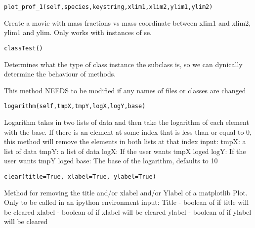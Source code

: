 \begin{verbatim}
plot_prof_1(self,species,keystring,xlim1,xlim2,ylim1,ylim2)
\end{verbatim}
Create a movie with mass fractions vs mass coordinate 
		between xlim1 and xlim2, ylim1 and ylim. Only works with instances of se.\newline\newline
\begin{verbatim}
classTest()
\end{verbatim}
Determines what the type of class instance the subclass is, so
		we can dynically determine the behaviour of methods.
		
		This method NEEDS to be modified if any names of files or classes
		are changed
\newline
\newline
\begin{verbatim}
logarithm(self,tmpX,tmpY,logX,logY,base)
\end{verbatim}
Logarithm takes in two lists of data and then take the 
		logarithm of each element with the base. If there is an
		element at some index that is less than or equal to 0, this 
		method will remove the elements in both lists at that index\newline
		input:\newline
		tmpX: a list of data\newline
		tmpY: a list of data\newline
		logX: If the user wants tmpX loged\newline
		logY: If the user wants tmpY loged\newline
		base: The base of the logarithm, defaults to 10\newline
		
		
\begin{verbatim}
clear(title=True, xlabel=True, ylabel=True)
\end{verbatim}
Method for removing the title and/or xlabel and/or Ylabel
		of a matplotlib Plot.  Only to be called in an ipython 
		environment\newline
		input:\newline
		Title -  boolean of if title will be cleared \newline
		xlabel - boolean of if xlabel will be cleared \newline
		ylabel - boolean of if ylabel will be cleared \newline\newline


